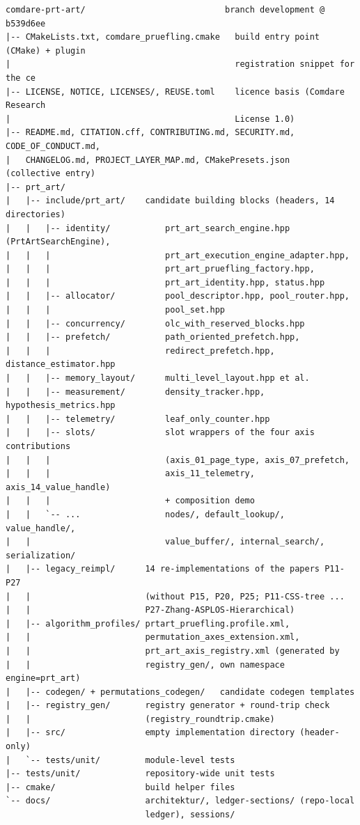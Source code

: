 {\footnotesize
\begin{verbatim}
comdare-prt-art/                            branch development @ b539d6ee
|-- CMakeLists.txt, comdare_pruefling.cmake   build entry point (CMake) + plugin
|                                             registration snippet for the ce
|-- LICENSE, NOTICE, LICENSES/, REUSE.toml    licence basis (Comdare Research
|                                             License 1.0)
|-- README.md, CITATION.cff, CONTRIBUTING.md, SECURITY.md, CODE_OF_CONDUCT.md,
|   CHANGELOG.md, PROJECT_LAYER_MAP.md, CMakePresets.json   (collective entry)
|-- prt_art/
|   |-- include/prt_art/    candidate building blocks (headers, 14 directories)
|   |   |-- identity/           prt_art_search_engine.hpp (PrtArtSearchEngine),
|   |   |                       prt_art_execution_engine_adapter.hpp,
|   |   |                       prt_art_pruefling_factory.hpp,
|   |   |                       prt_art_identity.hpp, status.hpp
|   |   |-- allocator/          pool_descriptor.hpp, pool_router.hpp,
|   |   |                       pool_set.hpp
|   |   |-- concurrency/        olc_with_reserved_blocks.hpp
|   |   |-- prefetch/           path_oriented_prefetch.hpp,
|   |   |                       redirect_prefetch.hpp, distance_estimator.hpp
|   |   |-- memory_layout/      multi_level_layout.hpp et al.
|   |   |-- measurement/        density_tracker.hpp, hypothesis_metrics.hpp
|   |   |-- telemetry/          leaf_only_counter.hpp
|   |   |-- slots/              slot wrappers of the four axis contributions
|   |   |                       (axis_01_page_type, axis_07_prefetch,
|   |   |                       axis_11_telemetry, axis_14_value_handle)
|   |   |                       + composition demo
|   |   `-- ...                 nodes/, default_lookup/, value_handle/,
|   |                           value_buffer/, internal_search/, serialization/
|   |-- legacy_reimpl/      14 re-implementations of the papers P11-P27
|   |                       (without P15, P20, P25; P11-CSS-tree ...
|   |                       P27-Zhang-ASPLOS-Hierarchical)
|   |-- algorithm_profiles/ prtart_pruefling.profile.xml,
|   |                       permutation_axes_extension.xml,
|   |                       prt_art_axis_registry.xml (generated by
|   |                       registry_gen/, own namespace engine=prt_art)
|   |-- codegen/ + permutations_codegen/   candidate codegen templates
|   |-- registry_gen/       registry generator + round-trip check
|   |                       (registry_roundtrip.cmake)
|   |-- src/                empty implementation directory (header-only)
|   `-- tests/unit/         module-level tests
|-- tests/unit/             repository-wide unit tests
|-- cmake/                  build helper files
`-- docs/                   architektur/, ledger-sections/ (repo-local
                            ledger), sessions/
\end{verbatim}
}

